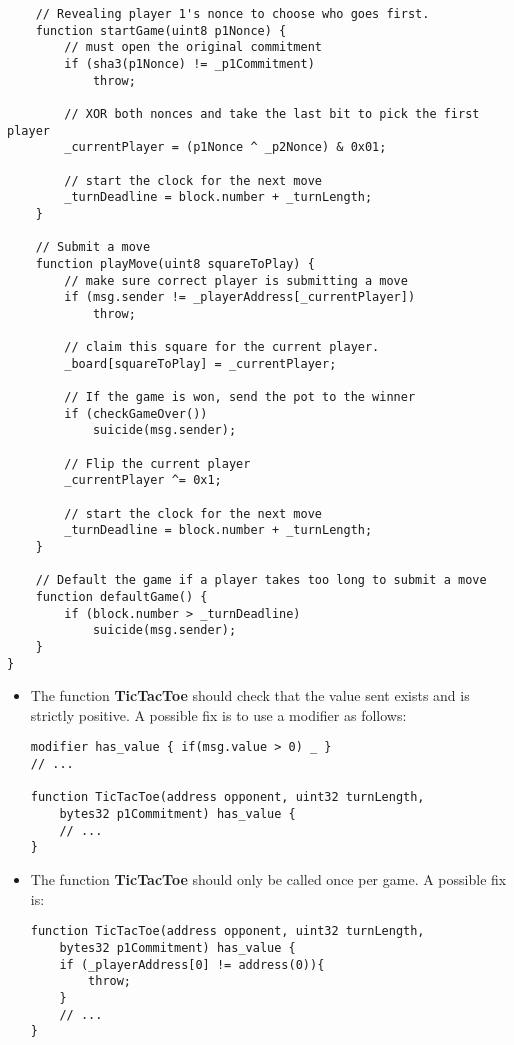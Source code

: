 \documentclass[11pt]{article}
\begin{document}
\begin{enumerate}
\begin{verbatim}
    // Revealing player 1's nonce to choose who goes first.
    function startGame(uint8 p1Nonce) {
        // must open the original commitment
        if (sha3(p1Nonce) != _p1Commitment)
            throw;

        // XOR both nonces and take the last bit to pick the first player
        _currentPlayer = (p1Nonce ^ _p2Nonce) & 0x01;

        // start the clock for the next move
        _turnDeadline = block.number + _turnLength;
    }

    // Submit a move
    function playMove(uint8 squareToPlay) {
        // make sure correct player is submitting a move
        if (msg.sender != _playerAddress[_currentPlayer])
            throw;

        // claim this square for the current player.
        _board[squareToPlay] = _currentPlayer;

        // If the game is won, send the pot to the winner
        if (checkGameOver())
            suicide(msg.sender);

        // Flip the current player
        _currentPlayer ^= 0x1;

        // start the clock for the next move
        _turnDeadline = block.number + _turnLength;
    }

    // Default the game if a player takes too long to submit a move
    function defaultGame() {
        if (block.number > _turnDeadline)
            suicide(msg.sender);
    }
}
\end{verbatim}

    \begin{itemize}
        \item The function \textbf{TicTacToe} should check that the value sent exists and is strictly positive. A possible fix is to use a modifier as follows:
        \begin{verbatim}
modifier has_value { if(msg.value > 0) _ }
// ...

function TicTacToe(address opponent, uint32 turnLength, 
    bytes32 p1Commitment) has_value {
    // ...
}
        \end{verbatim}
        
        \item The function \textbf{TicTacToe} should only be called once per game. A possible fix is:
        \begin{verbatim}
function TicTacToe(address opponent, uint32 turnLength, 
    bytes32 p1Commitment) has_value {
    if (_playerAddress[0] != address(0)){
        throw;
    }
    // ...
}
        \end{verbatim}
        

\end{itemize}
\end{enumerate}
\end{document}
